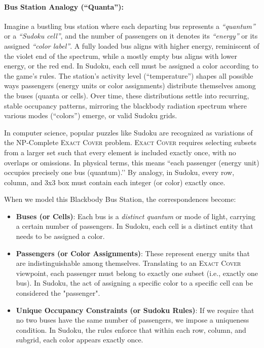 \documentclass{report}
\begin{document}
\paragraph{Bus Station Analogy (\textquotedblleft Quanta\textquotedblright):}
Imagine a bustling bus station where each departing bus represents a \emph{``quantum''} or a \emph{``Sudoku cell''}, and the number of passengers on it denotes its \emph{``energy''} or its assigned \emph{``color label''}. A fully loaded bus aligns with higher energy, reminiscent of the violet end of the spectrum, while a mostly empty bus aligns with lower energy, or the red end. In Sudoku, each cell must be assigned a color according to the game's rules. The station’s activity level (``temperature'') shapes all possible ways passengers (energy units or color assignments) distribute themselves among the buses (quanta or cells). Over time, these distributions settle into recurring, stable occupancy patterns, mirroring the blackbody radiation spectrum where various modes (``colors'') emerge, or valid Sudoku grids.

In computer science, popular puzzles like Sudoku are recognized as variations of the NP-Complete \textsc{Exact Cover} problem. \textsc{Exact Cover} requires selecting subsets from a larger set such that every element is included exactly once, with no overlaps or omissions. In physical terms, this means ``each passenger (energy unit) occupies precisely one bus (quantum).’’ By analogy, in Sudoku, every row, column, and 3x3 box must contain each integer (or color) exactly once.

When we model this Blackbody Bus Station, the correspondences become:

\begin{itemize}
    \item \textbf{Buses (or Cells)}:
    Each bus is a \emph{distinct quantum} or mode of light, carrying a certain number of passengers. In Sudoku, each cell is a distinct entity that needs to be assigned a color.

    \item \textbf{Passengers (or Color Assignments)}:
    These represent energy units that are indistinguishable among themselves. Translating to an \textsc{Exact Cover} viewpoint, each passenger must belong to exactly one subset (i.e., exactly one bus). In Sudoku, the act of assigning a specific color to a specific cell can be considered the "passenger".

    \item \textbf{Unique Occupancy Constraints (or Sudoku Rules)}:
    If we require that no two buses have the same number of passengers, we impose a uniqueness condition. In Sudoku, the rules enforce that within each row, column, and subgrid, each color appears exactly once.
\end{itemize}
\end{document}
